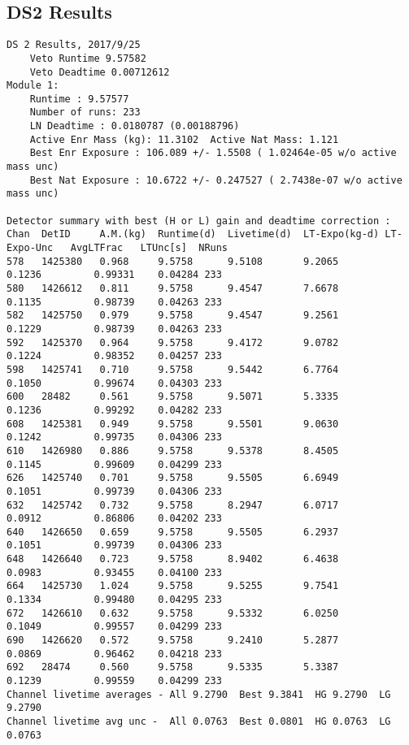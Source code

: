 \documentclass[notitlepage,rmp,aps,10pt]{revtex4-1}
\begin{document}
\subsection{DS2 Results}
\begin{verbatim}
DS 2 Results, 2017/9/25
	Veto Runtime 9.57582
	Veto Deadtime 0.00712612
Module 1:
	Runtime : 9.57577
	Number of runs: 233
	LN Deadtime : 0.0180787 (0.00188796)
	Active Enr Mass (kg): 11.3102  Active Nat Mass: 1.121
	Best Enr Exposure : 106.089 +/- 1.5508 ( 1.02464e-05 w/o active mass unc)
	Best Nat Exposure : 10.6722 +/- 0.247527 ( 2.7438e-07 w/o active mass unc)

Detector summary with best (H or L) gain and deadtime correction :
Chan  DetID     A.M.(kg)  Runtime(d)  Livetime(d)  LT-Expo(kg-d) LT-Expo-Unc   AvgLTFrac   LTUnc[s]  NRuns
578   1425380   0.968     9.5758      9.5108       9.2065         0.1236         0.99331    0.04284 233
580   1426612   0.811     9.5758      9.4547       7.6678         0.1135         0.98739    0.04263 233
582   1425750   0.979     9.5758      9.4547       9.2561         0.1229         0.98739    0.04263 233
592   1425370   0.964     9.5758      9.4172       9.0782         0.1224         0.98352    0.04257 233
598   1425741   0.710     9.5758      9.5442       6.7764         0.1050         0.99674    0.04303 233
600   28482     0.561     9.5758      9.5071       5.3335         0.1236         0.99292    0.04282 233
608   1425381   0.949     9.5758      9.5501       9.0630         0.1242         0.99735    0.04306 233
610   1426980   0.886     9.5758      9.5378       8.4505         0.1145         0.99609    0.04299 233
626   1425740   0.701     9.5758      9.5505       6.6949         0.1051         0.99739    0.04306 233
632   1425742   0.732     9.5758      8.2947       6.0717         0.0912         0.86806    0.04202 233
640   1426650   0.659     9.5758      9.5505       6.2937         0.1051         0.99739    0.04306 233
648   1426640   0.723     9.5758      8.9402       6.4638         0.0983         0.93455    0.04100 233
664   1425730   1.024     9.5758      9.5255       9.7541         0.1334         0.99480    0.04295 233
672   1426610   0.632     9.5758      9.5332       6.0250         0.1049         0.99557    0.04299 233
690   1426620   0.572     9.5758      9.2410       5.2877         0.0869         0.96462    0.04218 233
692   28474     0.560     9.5758      9.5335       5.3387         0.1239         0.99559    0.04299 233
Channel livetime averages - All 9.2790  Best 9.3841  HG 9.2790  LG 9.2790
Channel livetime avg unc -  All 0.0763  Best 0.0801  HG 0.0763  LG 0.0763

\end{verbatim}
\end{document}
